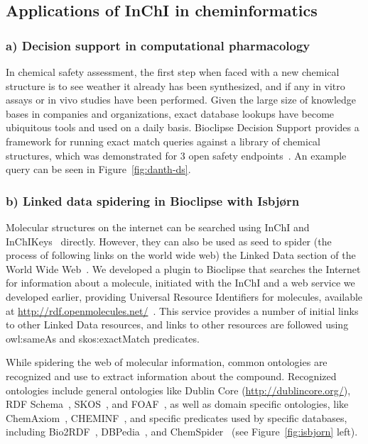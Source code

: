 \documentclass[10pt]{bmc_article}
\newenvironment{bmcformat}{\fussy\setboolean{publ}{true}}{\fussy}
\begin{document}
\begin{bmcformat}
\subsection*{Applications of InChI in cheminformatics}



\subsubsection*{a) Decision support in computational pharmacology}
In chemical safety assessment, the first step when faced with a new chemical structure is to see weather it already has been synthesized, and if any in vitro assays or in vivo studies have been performed. Given the large size of knowledge bases in companies and organizations, exact database lookups have become ubiquitous tools and used on a daily basis. Bioclipse Decision Support provides a framework for running exact match queries against a library of chemical structures, which was demonstrated for 3 open safety endpoints~\cite{Spjuth:2011qf}. An example query can be seen in Figure~\ref{fig:danth-ds}.


\subsubsection*{b) Linked data spidering in Bioclipse with Isbjørn}

Molecular structures on the internet can be searched using InChI and InChIKeys~\cite{Coles2005} directly.
However, they can also be used as seed to spider (the process of following links on the world wide web)
the Linked Data section of the World Wide Web~\cite{Samwald2011}. We developed a plugin to Bioclipse
that searches the Internet for information about a molecule, initiated with the InChI and a web service
we developed earlier, providing Universal Resource Identifiers for molecules, available
at \url{http://rdf.openmolecules.net/}~\cite{Willighagen2011}. This
service provides a number of initial links to other Linked Data resources, and links to other
resources are followed using owl:sameAs and skos:exactMatch predicates.

While spidering the web of molecular information, common ontologies are recognized and use to extract
information about the compound. Recognized ontologies include general ontologies like
Dublin Core (\url{http://dublincore.org/}), RDF Schema~\cite{Guha:04:RVD}, SKOS~\cite{Bechhofer:09:SSK},
and FOAF~\cite{Grav07}, as well as domain specific ontologies, like
ChemAxiom~\cite{Adams2009}, CHEMINF~\cite{Hastings2011}, and specific predicates
used by specific databases, including Bio2RDF~\cite{Belleau2008}, DBPedia~\cite{DBPEDIA},
and ChemSpider~\cite{Pence2010} (see Figure~\ref{fig:isbjorn} left).


\end{bmcformat}
\end{document}

